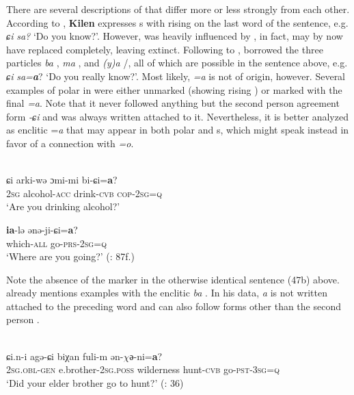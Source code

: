 There are several descriptions of  that differ more or less strongly from each other. According to \citet[157f.]{ZhangPaiyu2013}, \textbf{Kilen} expresses s with rising  on the last word of the sentence, e.g. \textit{ɕi} \textit{sa?} ‘Do you know?’. However,  was heavily influenced by , in fact,  may by now have replaced  completely, leaving  extinct. Following to \citet[158]{ZhangPaiyu2013},  borrowed the three  particles \textit{ba} , \textit{ma} , and \textit{(y)a} /, all of which are possible in the sentence above, e.g. \textit{ɕi} \textit{sa=}\textbf{\textit{a}}? ‘Do you really know?’. Most likely, \textit{=a} is not of  origin, however. Several examples of polar  in \citet{ZhangZhangDai1989} were either unmarked (showing rising ) or marked with the final  \textit{=a}. Note that it never followed anything but the second person  agreement form \textit{-ɕi} and was always written attached to it. Nevertheless, it is better analyzed as enclitic =\textit{a} that may appear in both polar and s, which might speak instead in favor of a connection with  \textit{=o}.

\ea%
    \label{ex:tungu:48}
    \\
    \ea
    \gll ɕi  arki-wə  ɔmi-mi    bi-ɕi=\textbf{{a}}?\\
    2\textsc{sg}  alcohol-\textsc{acc}  drink-\textsc{cvb}  \textsc{cop}-2\textsc{sg=q}\\
    \glt ‘Are you drinking alcohol?’
    
    \ex
    \gll \textbf{{ia}}-lə    ənə-ji-ɕi=\textbf{{a}}?\\
    which-\textsc{all}  go-\textsc{prs}-2\textsc{sg}=\textsc{q}\\
    \glt ‘Where are you going?’ (\citealt{ZhangZhangDai1989}: 87f.)
    \z
    \z

Note the absence of the marker in the otherwise identical sentence (47b) above. \citet{AnJun1986} already mentions examples with the  enclitic \textit{ba} . In his data, \textit{a} is not written attached to the preceding word and can also follow forms other than the second person .

\ea%
    \label{ex:tungu:49}
    \\
    \gll ɕi.n-i    agə-ɕi      biχan    fuli-m    ən-$\chi ə$-ni=\textbf{{a}}?\\
    2\textsc{sg}.\textsc{obl}-\textsc{gen}  e.brother-2\textsc{sg}.\textsc{poss}  wilderness  hunt-\textsc{cvb}  go-\textsc{pst}-3\textsc{sg}=\textsc{q}\\
    \glt ‘Did your elder brother go to hunt?’ (\citealt{AnJun1986}: 36)
    \z

